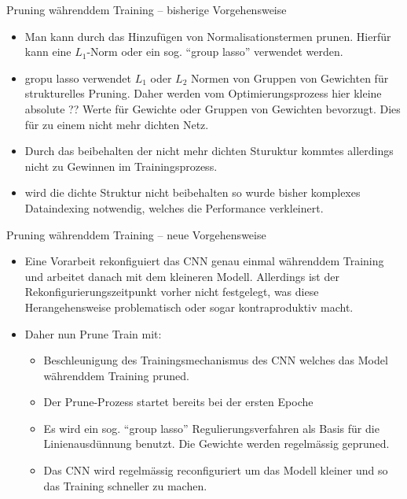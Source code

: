 \documentclass[10pt]{beamer}
\begin{document}
\begin{frame}{Pruning währenddem Training -- bisherige Vorgehensweise}
\begin{itemize}
 \item Man kann durch das Hinzufügen von Normalisationstermen prunen. Hierfür kann eine $L_1$-Norm oder ein sog. ``group lasso'' verwendet werden.
 \item gropu lasso verwendet $L_1$ oder $L_2$ Normen von Gruppen von Gewichten für strukturelles Pruning. Daher werden vom Optimierungsprozess hier kleine absolute ?? Werte für Gewichte oder Gruppen von Gewichten bevorzugt. Dies für zu einem nicht mehr dichten Netz.
 \item Durch das beibehalten der nicht mehr dichten Sturuktur kommtes allerdings nicht zu Gewinnen im Trainingsprozess.
 \item wird die dichte Struktur nicht beibehalten so wurde bisher komplexes Dataindexing notwendig, welches die Performance verkleinert. 
\end{itemize}
\end{frame}

\begin{frame}{Pruning währenddem Training -- neue Vorgehensweise}
\begin{itemize}
 \item Eine Vorarbeit rekonfiguiert das CNN genau einmal währenddem Training und arbeitet danach mit dem kleineren Modell. Allerdings ist der Rekonfigurierungszeitpunkt vorher nicht festgelegt, was diese Herangehensweise problematisch oder sogar kontraproduktiv macht.
 \item Daher nun Prune Train mit:
 \begin{itemize}
  \item Beschleunigung des Trainingsmechanismus des CNN welches das Model währenddem Training pruned.
  \item Der Prune-Prozess startet bereits bei der ersten Epoche
  \item Es wird ein sog. ``group lasso'' Regulierungsverfahren als Basis für die Linienausdünnung benutzt. Die Gewichte werden regelmässig gepruned.
  \item Das CNN wird regelmässig reconfiguriert um das Modell kleiner und so das Training schneller zu machen.
 \end{itemize}
\end{itemize}
 
\end{frame}
\end{document}

